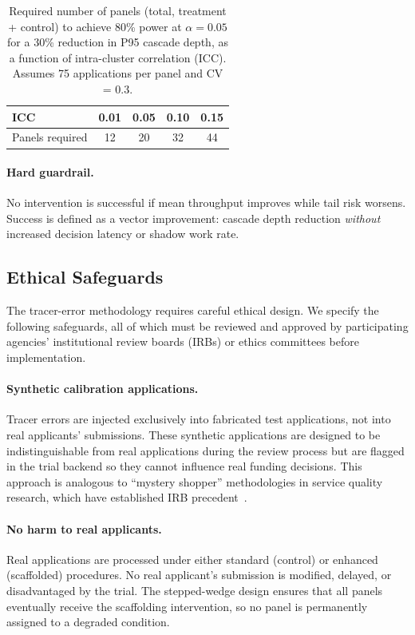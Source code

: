 \documentclass[runningheads]{llncs}
\begin{document}
\begin{table}[t]
\centering
\caption{Required number of panels (total, treatment + control) to achieve 80\% power at $\alpha = 0.05$ for a 30\% reduction in P95 cascade depth, as a function of intra-cluster correlation (ICC). Assumes 75 applications per panel and CV = 0.3.}
\label{tab:icc}
\begin{tabular}{@{}lcccc@{}}
\toprule
ICC & 0.01 & 0.05 & 0.10 & 0.15 \\
\midrule
Panels required & 12 & 20 & 32 & 44 \\
\bottomrule
\end{tabular}
\end{table}

\paragraph{Hard guardrail.}
No intervention is successful if mean throughput improves while tail risk worsens. Success is defined as a vector improvement: cascade depth reduction \emph{without} increased decision latency or shadow work rate.

\subsection{Ethical Safeguards}
\label{sec:ethics}

The tracer-error methodology requires careful ethical design. We specify the following safeguards, all of which must be reviewed and approved by participating agencies' institutional review boards (IRBs) or ethics committees before implementation.

\paragraph{Synthetic calibration applications.} Tracer errors are injected exclusively into fabricated test applications, not into real applicants' submissions. These synthetic applications are designed to be indistinguishable from real applications during the review process but are flagged in the trial backend so they cannot influence real funding decisions. This approach is analogous to ``mystery shopper'' methodologies in service quality research, which have established IRB precedent~\cite{ombudget2024}.

\paragraph{No harm to real applicants.} Real applications are processed under either standard (control) or enhanced (scaffolded) procedures. No real applicant's submission is modified, delayed, or disadvantaged by the trial. The stepped-wedge design ensures that all panels eventually receive the scaffolding intervention, so no panel is permanently assigned to a degraded condition.
\end{document}
